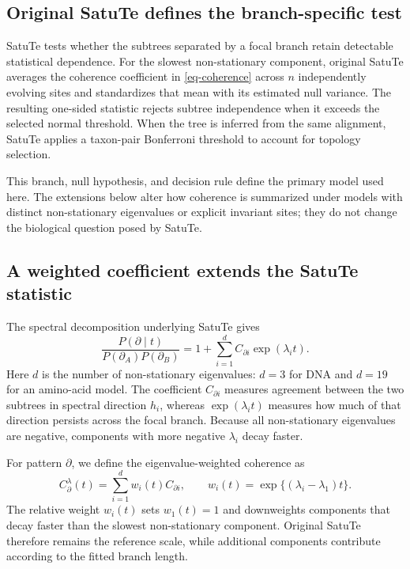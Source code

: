 \subsection*{Original SatuTe defines the branch-specific test}

SatuTe tests whether the subtrees separated by a focal branch retain detectable statistical dependence. For the slowest non-stationary component, original SatuTe averages the coherence coefficient in \cref{eq-coherence} across \(n\) independently evolving sites and standardizes that mean with its estimated null variance. The resulting one-sided statistic rejects subtree independence when it exceeds the selected normal threshold. When the tree is inferred from the same alignment, SatuTe applies a taxon-pair Bonferroni threshold to account for topology selection.

This branch, null hypothesis, and decision rule define the primary model used here. The extensions below alter how coherence is summarized under models with distinct non-stationary eigenvalues or explicit invariant sites; they do not change the biological question posed by SatuTe.

\subsection*{A weighted coefficient extends the SatuTe statistic}

The spectral decomposition underlying SatuTe gives
\begin{equation}
\frac{P(\partial\mid t)}{P(\partial_A)P(\partial_B)}
=
1+\sum_{i=1}^{d} C_{\partial i}\exp(\lambda_i t).
\label{eq-central}
\end{equation}
Here \(d\) is the number of non-stationary eigenvalues: \(d=3\) for DNA and \(d=19\) for an amino-acid model. The coefficient \(C_{\partial i}\) measures agreement between the two subtrees in spectral direction \(h_i\), whereas \(\exp(\lambda_i t)\) measures how much of that direction persists across the focal branch. Because all non-stationary eigenvalues are negative, components with more negative \(\lambda_i\) decay faster.

For pattern \(\partial\), we define the eigenvalue-weighted coherence as
\begin{equation}
C_{\partial}^{\lambda}(t)
=
\sum_{i=1}^{d} w_i(t)C_{\partial i},
\qquad
w_i(t)=\exp\{(\lambda_i-\lambda_1)t\}.
\label{eq-weighted-coherence}
\end{equation}
The relative weight \(w_i(t)\) sets \(w_1(t)=1\) and downweights components that decay faster than the slowest non-stationary component. Original SatuTe therefore remains the reference scale, while additional components contribute according to the fitted branch length.

